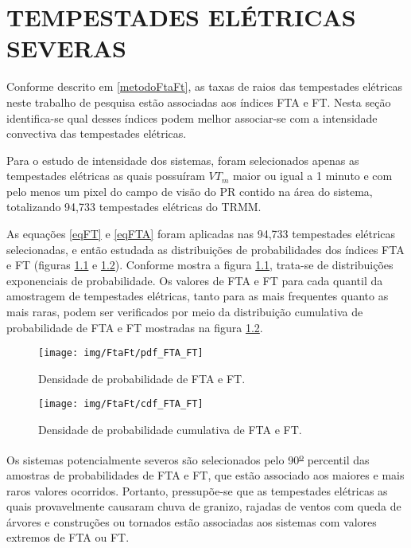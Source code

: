 \chapter{TEMPESTADES ELÉTRICAS SEVERAS}

Conforme descrito em \ref{metodoFtaFt}, as taxas de raios das tempestades elétricas neste trabalho de pesquisa estão associadas aos índices FTA e FT. Nesta seção identifica-se qual desses índices podem melhor associar-se com a intensidade convectiva das tempestades elétricas.

Para o estudo de intensidade dos sistemas, foram selecionados apenas as tempestades elétricas as quais possuíram $VT_m$ maior ou igual a 1 minuto e com pelo menos um pixel do campo de visão do PR contido na área do sistema, totalizando 94,733 tempestades elétricas do TRMM. %

As equações \ref{eqFT} e \ref{eqFTA} foram aplicadas nas 94,733 tempestades elétricas selecionadas, e então estudada as distribuições de probabilidades dos índices FTA e FT (figuras \ref{pdfFTAFT} e \ref{cdfFTAFT}). Conforme mostra a figura \ref{pdfFTAFT}, trata-se de distribuições exponenciais de probabilidade. Os valores de FTA e FT para cada quantil da amostragem de tempestades elétricas, tanto para as mais frequentes quanto as mais raras, podem ser verificados por meio da distribuição cumulativa de probabilidade de FTA e FT mostradas na figura \ref{cdfFTAFT}. 

\begin{figure}[!ht]
  \centering
  \texttt{[image: img/FtaFt/pdf\_FTA\_FT]}      
  \caption{Densidade de probabilidade de FTA e FT.} 
   \label{pdfFTAFT} 
\end{figure}

\begin{figure}[!hb]
  \centering 
  \texttt{[image: img/FtaFt/cdf\_FTA\_FT]} 
  \caption{Densidade de probabilidade cumulativa de FTA e FT.}
  \label{cdfFTAFT}
\end{figure}

Os sistemas potencialmente severos são selecionados pelo 90\textsuperscript{\underline{o}} percentil das amostras de probabilidades de FTA e FT, que estão associado aos maiores e mais raros valores ocorridos. Portanto, pressupõe-se que as tempestades elétricas as quais provavelmente causaram chuva de granizo, rajadas de ventos com queda de árvores e construções ou tornados estão associadas aos sistemas com valores extremos de FTA ou FT.

